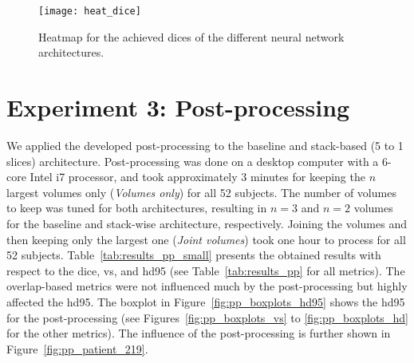 \begin{figure}[htbp]	
	\centering
	\texttt{[image: heat\_dice]}
    \caption[Heatmap for the \acrlong{dice} for 3-D Context]{Heatmap for the achieved \acrlong{dice}s of the different neural network architectures.}
    \label{fig:results_heatmap_dice}
\end{figure}


\section{Experiment 3: Post-processing} \label{sec:exp_pp} %
We applied the developed post-processing to the baseline and stack-based (5 to 1 slices) architecture. Post-processing was done on a desktop computer with a 6-core Intel i7 processor, and took approximately 3 minutes for keeping the $n$ largest volumes only (\textit{Volumes only}) for all 52 subjects. The number of volumes to keep was tuned for both architectures, resulting in $n = 3$ and $n = 2$ volumes for the baseline and stack-wise architecture, respectively. Joining the volumes and then keeping only the largest one (\textit{Joint volumes}) took one hour to process for all 52 subjects. Table~\ref{tab:results_pp_small} presents the obtained results with respect to the \acrlong{dice}, \acrlong{vs}, and \acrlong{hd95} (see Table~\ref{tab:results_pp} for all metrics). The overlap-based metrics were not influenced much by the post-processing but highly affected the \gls{hd95}. The boxplot in Figure~\ref{fig:pp_boxplots_hd95} shows the \acrlong{hd95} for the post-processing (see Figures~\ref{fig:pp_boxplots_vs} to \ref{fig:pp_boxplots_hd} for the other metrics). The influence of the post-processing is further shown in Figure~\ref{fig:pp_patient_219}.

